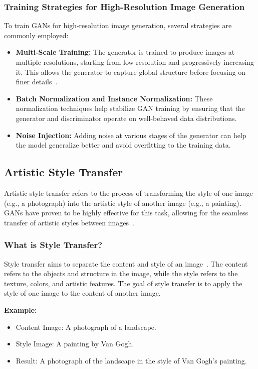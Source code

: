 \subsubsection{Training Strategies for High-Resolution Image Generation}
To train GANs for high-resolution image generation, several strategies are commonly employed:
\begin{itemize}
    \item \textbf{Multi-Scale Training:} The generator is trained to produce images at multiple resolutions, starting from low resolution and progressively increasing it. This allows the generator to capture global structure before focusing on finer details~\cite{wang2018cgan}.
    \item \textbf{Batch Normalization and Instance Normalization:} These normalization techniques help stabilize GAN training by ensuring that the generator and discriminator operate on well-behaved data distributions.
    \item \textbf{Noise Injection:} Adding noise at various stages of the generator can help the model generalize better and avoid overfitting to the training data.
\end{itemize}

\subsection{Artistic Style Transfer}
Artistic style transfer refers to the process of transforming the style of one image (e.g., a photograph) into the artistic style of another image (e.g., a painting). GANs have proven to be highly effective for this task, allowing for the seamless transfer of artistic styles between images~\cite{wang2020attentive}. 

\subsubsection{What is Style Transfer?}
Style transfer aims to separate the content and style of an image~\cite{jing2019neural}. The content refers to the objects and structure in the image, while the style refers to the texture, colors, and artistic features. The goal of style transfer is to apply the style of one image to the content of another image.

\textbf{Example:} 
\begin{itemize}
    \item Content Image: A photograph of a landscape.
    \item Style Image: A painting by Van Gogh.
    \item Result: A photograph of the landscape in the style of Van Gogh's painting.
\end{itemize}

